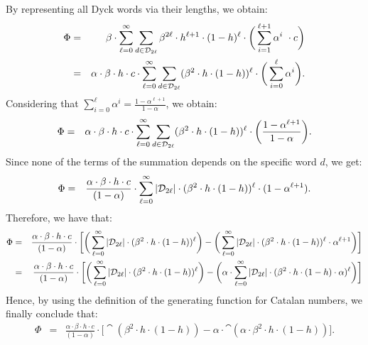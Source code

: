 By representing all Dyck words via their lengths, we obtain:
\begin{eqnarray*}
\Phi & = & \beta \cdot \sum_{\ell=0}^{\infty}\sum_{d\in \mathcal{D}_{2\ell}} \beta^{2 \ell }\cdot h^{\ell +1} \cdot (1-h)^{\ell}\cdot  \bigg(\sum_{i=1}^{\ell+1}\alpha^i\ \cdot c \bigg)\\
& = & \alpha\cdot \beta\cdot h \cdot c \cdot \sum_{\ell=0}^{\infty}\sum_{d\in \mathcal{D}_{2\ell}}  (\beta^{2}\cdot h\cdot (1-h))^{\ell}\cdot \bigg(\sum_{i=0}^{\ell}\alpha^i\bigg).
\end{eqnarray*}
Considering that $\sum_{i=0}^{\ell}\alpha^i = \frac{1-\alpha^{\ell+1}}{1-\alpha}$, we obtain:
\begin{eqnarray*}
\Phi & = & \alpha\cdot \beta\cdot h \cdot c \cdot \sum_{\ell=0}^{\infty}\sum_{d\in \mathcal{D}_{2\ell}}  (\beta^{2}\cdot h\cdot (1-h))^{\ell}\cdot \bigg(\frac{1-\alpha^{\ell+1}}{1-\alpha}\bigg).
\end{eqnarray*}
Since none of the terms of the summation depends on the specific word $d$, we get:
\begin{eqnarray*}
\Phi & = & \frac{\alpha\cdot \beta\cdot h \cdot c}{(1-\alpha)} \cdot \sum_{\ell=0}^{\infty} |\mathcal{D}_{2\ell}| \cdot (\beta^{2}\cdot h\cdot (1-h))^{\ell}\cdot (1-\alpha^{\ell+1}).
\end{eqnarray*}
Therefore, we have that:
\begin{eqnarray*}
\Phi & = & \frac{\alpha\cdot \beta\cdot h \cdot c}{(1-\alpha)} \cdot \bigg[\bigg(\sum_{\ell=0}^{\infty} |\mathcal{D}_{2\ell}| \cdot (\beta^{2}\cdot h\cdot (1-h))^{\ell}\bigg) - \bigg(\sum_{\ell=0}^{\infty} |\mathcal{D}_{2\ell}| \cdot (\beta^{2}\cdot h\cdot (1-h))^{\ell} \cdot \alpha^{\ell + 1}\bigg)\bigg]\\
& = & \frac{\alpha\cdot \beta\cdot h \cdot c}{(1-\alpha)} \cdot \bigg[\bigg(\sum_{\ell=0}^{\infty} |\mathcal{D}_{2\ell}| \cdot (\beta^{2}\cdot h\cdot (1-h))^{\ell}\bigg) - \bigg(\alpha \cdot \sum_{\ell=0}^{\infty} |\mathcal{D}_{2\ell}| \cdot (\beta^{2}\cdot h\cdot (1-h) \cdot \alpha)^{\ell}\bigg)\bigg]
\end{eqnarray*}
Hence, by using the definition of the generating function for Catalan numbers, we finally conclude that:
\begin{eqnarray*}
\Phi  & =  & \frac{\alpha\cdot \beta\cdot h \cdot c}{(1-\alpha)} \cdot \big[\cat(\beta^2\cdot h\cdot (1-h))-\alpha\cdot \cat(\alpha\cdot \beta^2\cdot h\cdot (1-h))\big].
\end{eqnarray*}

